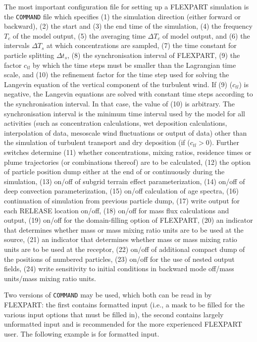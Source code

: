 \documentclass{egu}            %
\begin{document}
The most important configuration file for setting up a FLEXPART simulation is
the \verb|COMMAND| file which specifies (1) the simulation direction (either
forward or backward), (2) the start and (3) the end time of the simulation, (4)
the frequency $T_c$ of the model output, (5) the averaging time $\Delta T_c$ of
model output, and (6) the intervals $\Delta T_s$ at which concentrations are
sampled, (7) the time constant for particle splitting $\Delta t_s$, (8) the
synchronisation interval of FLEXPART, (9) the factor $c_{tl}$ by which the time
steps must be smaller than the Lagrangian time scale, and (10) the refinement
factor for the time step used for solving the Langevin equation of the vertical
component of the turbulent wind.  If (9) ($c_{tl}$) is negative, the Langevin
equations are solved with constant time steps according to the synchronisation
interval.  In that case, the value of (10) is arbitrary.  The synchronisation
interval is the minimum time interval used by the model for all activities
(such as concentration calculations, wet deposition calculations, interpolation
of data, mesoscale wind fluctuations or output of data) other than the
simulation of turbulent transport and dry deposition (if ($c_{tl}>0$).  Further
switches determine (11) whether concentrations, mixing ratios, residence times
or plume trajectories (or combinations thereof) are to be calculated, (12) the
option of particle position dump either at the end of or continuously during
the simulation, (13) on/off of subgrid terrain effect parameterization, (14)
on/off of deep convection parameterization, (15) on/off calculation of age
spectra, (16) continuation of simulation from previous particle dump, (17)
write output for each RELEASE location on/off, (18) on/off for mass flux
calculations and output, (19) on/off for the domain-filling option of FLEXPART,
(20) an indicator that determines whether mass or mass mixing ratio units are
to be used at the source, (21) an indicator that determines whether mass or
mass mixing ratio units are to be used at the receptor, (22) on/off of
additional compact dump of the positions of numbered particles, (23) on/off for
the use of nested output fields, (24) write sensitivity to initial conditions
in backward mode off/mass units/mass mixing ratio units.

Two versions of \verb|COMMAND| may be used, which both can be read in by
FLEXPART: the first contains formatted input (i.e., a mask to be filled for the
various input options that must be filled in), the second contains largely
unformatted input and is recommended for the more experienced FLEXPART user.
The following example is for formatted input.
\end{document}
